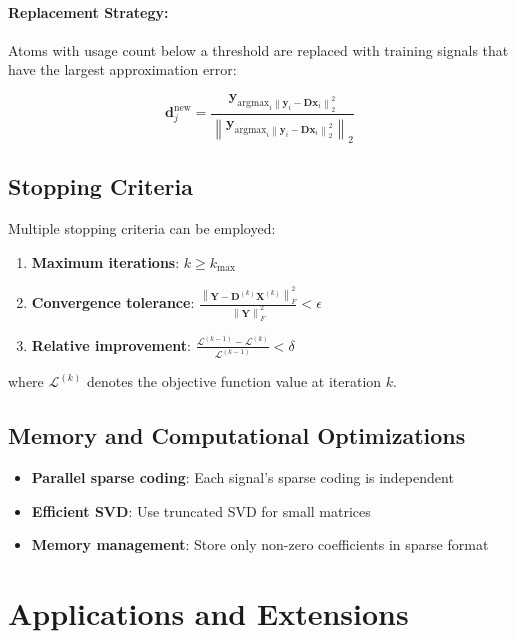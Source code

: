 \documentclass[12pt]{article}
\renewcommand{\vec}[1]{\mathbf{#1}}
\newcommand{\norm}[1]{\left\|#1\right\|}
\theoremstyle{definition}
\begin{document}
\paragraph{Replacement Strategy:} Atoms with usage count below a threshold are replaced with training signals that have the largest approximation error:

\begin{equation}
    \vec{d}_j^{\text{new}} = \frac{\vec{y}_{\text{argmax}_i \norm{\vec{y}_i - \mathbf{D}\vec{x}_i}_2^2}}{\norm{\vec{y}_{\text{argmax}_i \norm{\vec{y}_i - \mathbf{D}\vec{x}_i}_2^2}}_2}
\end{equation}

\subsection{Stopping Criteria}

Multiple stopping criteria can be employed:

\begin{enumerate}
    \item \textbf{Maximum iterations}: $k \geq k_{\max}$
    \item \textbf{Convergence tolerance}: $\frac{\norm{\mathbf{Y} - \mathbf{D}^{(k)}\mathbf{X}^{(k)}}_F^2}{\norm{\mathbf{Y}}_F^2} < \epsilon$
    \item \textbf{Relative improvement}: $\frac{\mathcal{L}^{(k-1)} - \mathcal{L}^{(k)}}{\mathcal{L}^{(k-1)}} < \delta$
\end{enumerate}

where $\mathcal{L}^{(k)}$ denotes the objective function value at iteration $k$.

\subsection{Memory and Computational Optimizations}

\begin{itemize}
    \item \textbf{Parallel sparse coding}: Each signal's sparse coding is independent
    \item \textbf{Efficient SVD}: Use truncated SVD for small matrices
    \item \textbf{Memory management}: Store only non-zero coefficients in sparse format
\end{itemize}

\newpage

\section{Applications and Extensions}
\end{document}
